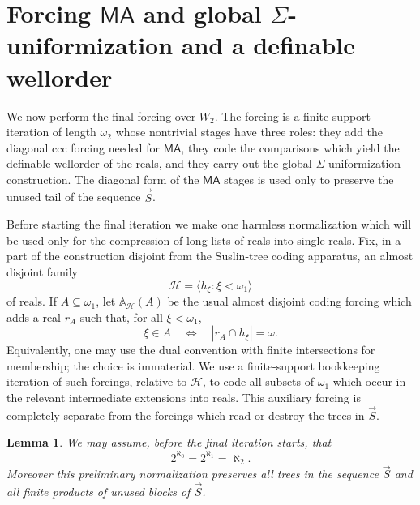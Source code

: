 \documentclass[a4paper,11pt]{article}
\newtheorem{lemma}[theorem]{Lemma}
\begin{document}
\section{Forcing $\mathsf{MA}$ and global $\Sigma$-uniformization and a definable wellorder}\label{sec:final-iteration}

We now perform the final forcing over $W_2$.  The forcing is a finite-support iteration of length $\omega_2$ whose nontrivial stages have three roles: they add the diagonal ccc forcing needed for $\mathsf{MA}$, they code the comparisons which yield the definable wellorder of the reals, and they carry out the global $\Sigma$-uniformization construction.  The diagonal form of the $\mathsf{MA}$ stages is used only to preserve the unused tail of the sequence $\vec S$.

Before starting the final iteration we make one harmless normalization which will be used only for the compression of long lists of reals into single reals.  Fix, in a part of the construction disjoint from the Suslin-tree coding apparatus, an almost disjoint family
\[
   \mathcal H=\langle h_\xi:\xi<\omega_1\rangle
\]
of reals.  If $A\subseteq\omega_1$, let $\mathbb A_{\mathcal H}(A)$ be the usual almost disjoint coding forcing which adds a real $r_A$ such that, for all $\xi<\omega_1$,
\[
   \xi\in A \quad\Longleftrightarrow\quad |r_A\cap h_\xi|=\omega .
\]
Equivalently, one may use the dual convention with finite intersections for membership; the choice is immaterial.  We use a finite-support bookkeeping iteration of such forcings, relative to $\mathcal H$, to code all subsets of $\omega_1$ which occur in the relevant intermediate extensions into reals.  This auxiliary forcing is completely separate from the forcings which read or destroy the trees in $\vec S$.

\begin{lemma}\label{lemma:H-normalization}
We may assume, before the final iteration starts, that
\[
   2^{\aleph_0}=2^{\aleph_1}=\aleph_2.
\]
Moreover this preliminary normalization preserves all trees in the sequence $\vec S$ and all finite products of unused blocks of $\vec S$.
\end{lemma}
\end{document}
